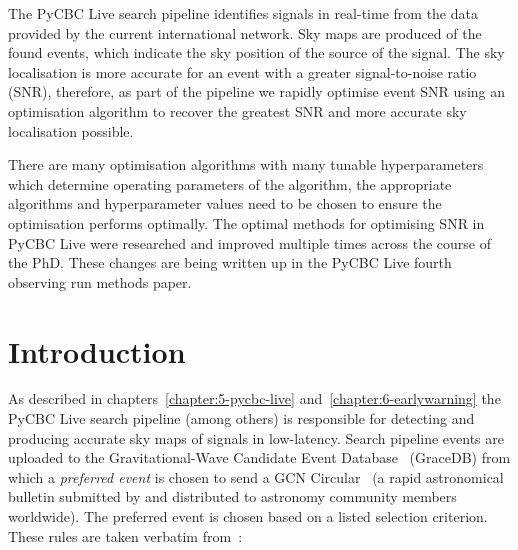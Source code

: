 The PyCBC Live search pipeline identifies \gwadj signals in real-time from the \gwadj data provided by the current international \gwadj network. Sky maps are produced of the found \gwadj events, which indicate the sky position of the source of the signal. The sky localisation is more accurate for an event with a greater signal-to-noise ratio (SNR), therefore, as part of the pipeline we rapidly optimise event SNR using an optimisation algorithm to recover the greatest SNR and more accurate sky localisation possible.

There are many optimisation algorithms with many tunable hyperparameters which determine operating parameters of the algorithm, the appropriate algorithms and hyperparameter values need to be chosen to ensure the optimisation performs optimally. The optimal methods for optimising SNR in PyCBC Live were researched and improved multiple times across the course of the PhD. These changes are being written up in the PyCBC Live fourth observing run methods paper.

\section{\label{7:sec:introduction}Introduction}


As described in chapters~\ref{chapter:5-pycbc-live} and~\ref{chapter:6-earlywarning} the PyCBC Live search pipeline (among others) is responsible for detecting and producing accurate sky maps of \gwadj signals in low-latency. Search pipeline events are uploaded to the Gravitational-Wave Candidate Event Database~\cite{ligo_gracedb:2024} (GraceDB) from which a \textit{preferred event} is chosen to send a GCN Circular~\cite{gcn_circulars:2024} (a rapid astronomical bulletin submitted by and distributed to astronomy community members worldwide). The preferred event is chosen based on a listed selection criterion. These rules are taken verbatim from~\cite{gracedb_superevent_selection}:

